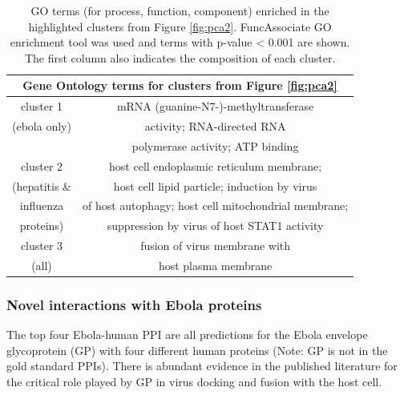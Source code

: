 \documentclass{bioinfo}
\begin{document}
\begin{table}[bht]
\label{goterms}
\begin{scriptsize}
\begin{center}
\def\arraystretch{1.1}
\begin{tabular}{|c|c|}
\multicolumn{2}{c}{Gene Ontology terms for clusters from Figure \ref{fig:pca2}} \\ \hline
cluster 1 & mRNA (guanine-N7-)-methyltransferase  \\
(ebola only)& activity; RNA-directed RNA   \\
& polymerase activity; ATP binding \\ \hline
cluster 2 & host cell endoplasmic reticulum membrane; \\ 
(hepatitis \& & host cell lipid particle; induction by virus \\
influenza & of host autophagy; host cell mitochondrial membrane; \\
proteins) & suppression by virus of host STAT1 activity \\ \hline
cluster 3 & fusion of virus membrane with \\
(all) & host plasma membrane \\ \hline
\end{tabular}
\caption{GO terms (for process, function, component) enriched in the highlighted clusters from Figure \ref{fig:pca2}. FuncAssociate GO enrichment tool was used and terms with p-value < 0.001 are shown. The first column also indicates the composition of each cluster.}
\end{center}
\end{scriptsize}
\end{table}

 


\subsubsection{Novel interactions with Ebola proteins}
The top four Ebola-human PPI are all predictions for the Ebola envelope glycoprotein (GP) with four different human proteins (Note: GP is not in the gold standard PPIs). There is abundant evidence in the published literature \citep{nanbo2010} for the critical role played by GP in virus docking and fusion with the host cell.
\end{document}

